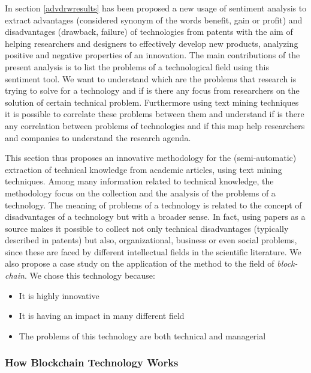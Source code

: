 \documentclass[b5paper,]{book}
\providecommand{\tightlist}{%
  \setlength{\itemsep}{0pt}\setlength{\parskip}{0pt}}
\theoremstyle{definition}
\theoremstyle{definition}
\theoremstyle{definition}
\theoremstyle{remark}
\begin{document}
In section \ref{advdrwresults} has been proposed a new usage of
sentiment analysis to extract advantages (considered synonym of the
words benefit, gain or profit) and disadvantages (drawback, failure) of
technologies from patents with the aim of helping researchers and
designers to effectively develop new products, analyzing positive and
negative properties of an innovation. The main contributions of the
present analysis is to list the problems of a technological field using
this sentiment tool. We want to understand which are the problems that
research is trying to solve for a technology and if is there any focus
from researchers on the solution of certain technical problem.
Furthermore using text mining techniques it is possible to correlate
these problems between them and understand if is there any correlation
between problems of technologies and if this map help researchers and
companies to understand the research agenda.

This section thus proposes an innovative methodology for the
(semi-automatic) extraction of technical knowledge from academic
articles, using text mining techniques. Among many information related
to technical knowledge, the methodology focus on the collection and the
analysis of the problems of a technology. The meaning of problems of a
technology is related to the concept of disadvantages of a technology
but with a broader sense. In fact, using papers as a source makes it
possible to collect not only technical disadvantages (typically
described in patents) but also, organizational, business or even social
problems, since these are faced by different intellectual fields in the
scientific literature. We also propose a case study on the application
of the method to the field of \emph{block-chain}. We chose this
technology because:

\begin{itemize}
\tightlist
\item
  It is highly innovative
\item
  It is having an impact in many different field
\item
  The problems of this technology are both technical and managerial
\end{itemize}

\subsubsection*{How Blockchain Technology
Works}\label{how-blockchain-technology-works}
\end{document}
